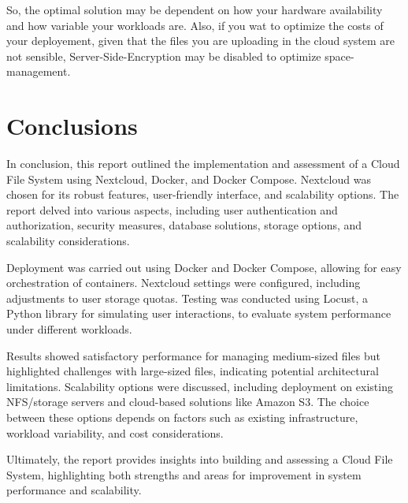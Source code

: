 \documentclass{article}
\begin{document}
	So, the optimal solution may be dependent on how your hardware availability and how variable your workloads are. Also, if you wat to optimize the costs of your deployement, given that the files you are uploading in the cloud system are not sensible, Server-Side-Encryption may be disabled to optimize space-management.
	
	\section{Conclusions}
	In conclusion, this report outlined the implementation and assessment of a Cloud File System using Nextcloud, Docker, and Docker Compose. Nextcloud was chosen for its robust features, user-friendly interface, and scalability options. The report delved into various aspects, including user authentication and authorization, security measures, database solutions, storage options, and scalability considerations.
	
	Deployment was carried out using Docker and Docker Compose, allowing for easy orchestration of containers. Nextcloud settings were configured, including adjustments to user storage quotas. Testing was conducted using Locust, a Python library for simulating user interactions, to evaluate system performance under different workloads.
	
	Results showed satisfactory performance for managing medium-sized files but highlighted challenges with large-sized files, indicating potential architectural limitations. Scalability options were discussed, including deployment on existing NFS/storage servers and cloud-based solutions like Amazon S3. The choice between these options depends on factors such as existing infrastructure, workload variability, and cost considerations.
	
	Ultimately, the report provides insights into building and assessing a Cloud File System, highlighting both strengths and areas for improvement in system performance and scalability.
	
	
	
\end{document}
